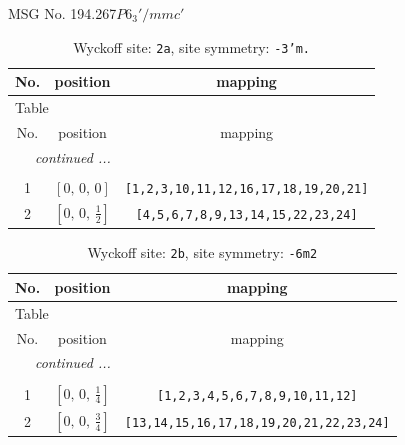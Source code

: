 \documentclass[fleqn,8pt]{jsarticle}
\begin{document}
\setcounter{MaxMatrixCols}{32}

\renewcommand{\tablename}{Table~}
\renewcommand{\figurename}{Figure~}
\begin{center}
\LARGE
MSG No. 194.267\quad$P6_{3}'/mmc'$
\end{center}
\renewcommand{\arraystretch}{1.2}
\begin{longtable}{ccc}
\caption{Wyckoff site: {\tt 2a}, site symmetry: {\tt -3'm.}}
 \\
 \hline \hline
No. & position & mapping \\ \hline \endfirsthead

\multicolumn{2}{l}{\tablename\ \thetable{}} \\
 \hline \hline
No. & position & mapping \\ \hline \endhead

 \hline \hline
\multicolumn{2}{r}{\footnotesize\it continued ...} \\ \endfoot

 \hline \hline
\multicolumn{2}{r}{} \\ \endlastfoot

1 & $\left[ 0,\, 0,\, 0 \right]$ & {\tt [1,2,3,10,11,12,16,17,18,19,20,21]} \\ \hline
2 & $\left[ 0,\, 0,\, \frac{1}{2} \right]$ & {\tt [4,5,6,7,8,9,13,14,15,22,23,24]} \\
\end{longtable}
\renewcommand{\arraystretch}{1.2}
\begin{longtable}{ccc}
\caption{Wyckoff site: {\tt 2b}, site symmetry: {\tt -6m2}}
 \\
 \hline \hline
No. & position & mapping \\ \hline \endfirsthead

\multicolumn{2}{l}{\tablename\ \thetable{}} \\
 \hline \hline
No. & position & mapping \\ \hline \endhead

 \hline \hline
\multicolumn{2}{r}{\footnotesize\it continued ...} \\ \endfoot

 \hline \hline
\multicolumn{2}{r}{} \\ \endlastfoot

1 & $\left[ 0,\, 0,\, \frac{1}{4} \right]$ & {\tt [1,2,3,4,5,6,7,8,9,10,11,12]} \\ \hline
2 & $\left[ 0,\, 0,\, \frac{3}{4} \right]$ & {\tt [13,14,15,16,17,18,19,20,21,22,23,24]} \\
\end{longtable}
\end{document}

